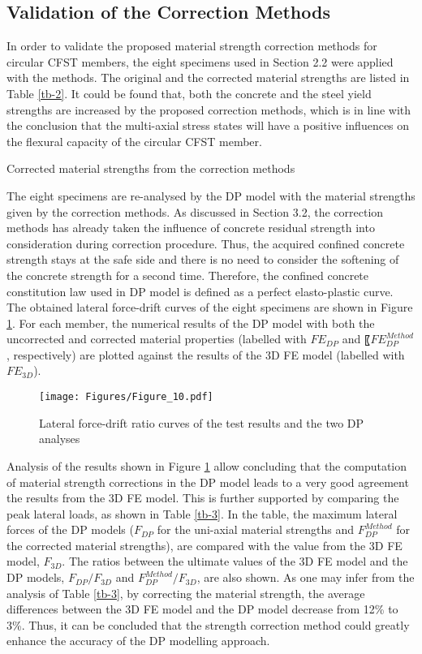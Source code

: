 \documentclass[12pt,a4]{article}
\begin{document}
	\subsection{Validation of the Correction Methods}
	In order to validate the proposed material strength correction methods for circular CFST members, the eight specimens used in Section 2.2 were applied with the methods. The original and the corrected material strengths are listed in Table \ref{tb-2}. It could be found that, both the concrete and the steel yield strengths are increased by the proposed correction methods, which is in line with the conclusion that the multi-axial stress states will have a positive influences on the flexural capacity of the circular CFST member.
	\par
	\begin{table}
		\caption{Corrected material strengths from the correction methods}
		\label{tb-2}
	\end{table}
	\par
	The eight specimens are re-analysed by the DP model with the material strengths given by the correction methods. As discussed in Section 3.2, the correction methods has already taken the influence of concrete residual strength into consideration during correction procedure. Thus, the acquired confined concrete strength stays at the safe side and there is no need to consider the softening of the concrete strength for a second time. Therefore, the confined concrete constitution law used in DP model is defined as a perfect elasto-plastic curve. The obtained lateral force-drift curves of the eight specimens are shown in Figure \ref{fig-9}. For each member, the numerical results of the DP model with both the uncorrected and corrected material properties (labelled with $FE_{DP}$ and 〖$FE_{DP}^{Method}$, respectively) are plotted against the results of the 3D FE model (labelled with $FE_{3D}$).
	\par
	\begin{figure}[h]
		\centering
		\texttt{[image: Figures/Figure\_10.pdf]}
		\caption{Lateral force-drift ratio curves of the test results and the two DP analyses}
		\label{fig-9}
	\end{figure}
	\par
	Analysis of the results shown in Figure \ref{fig-9} allow concluding that the computation of material strength corrections in the DP model leads to a very good agreement the results from the 3D FE model. This is further supported by comparing the peak lateral loads, as shown in Table \ref{tb-3}. In the table, the maximum lateral forces of the DP models ($F_{DP}$ for the uni-axial material strengths and $F_{DP}^{Method}$ for the corrected material strengths), are compared with the value from the 3D FE model, $F_{3D}$. The ratios between the ultimate values of the 3D FE model and the DP models, $F_{DP}/F_{3D}$ and $F_{DP}^{Method}/F_{3D}$, are also shown. As one may infer from the analysis of Table \ref{tb-3}, by correcting the material strength, the average differences between the 3D FE model and the DP model decrease from 12\% to 3\%. Thus, it can be concluded that the strength correction method could greatly enhance the accuracy of the DP modelling approach. 
\end{document}
